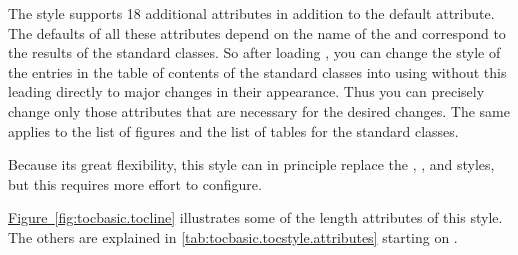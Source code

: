 \begin{description}
  The style supports 18 additional attributes in
  addition to the default  attribute. The defaults of all these
  attributes depend on the name of the  and correspond to
  the results of the standard classes. So after loading ,
  you can change the style of the entries in the table of contents of the
  standard classes into  using
   without this leading directly
  to major changes in their appearance. Thus you can precisely change only
  those attributes that are necessary for the desired changes. The same
  applies to the list of figures and the list of tables for the standard
  classes.

  Because its great flexibility, this style can in principle replace the
  , , and 
  styles, but this requires more effort to configure.

  \hyperref[fig:tocbasic.tocline]%
  {Figure~\ref*{fig:tocbasic.tocline}} illustrates some of the length
  attributes of this style. The others are explained in
  \autoref{tab:tocbasic.tocstyle.attributes} starting on
  .
  \begin{figure}
    \centering
\end{figure}
\end{description}

